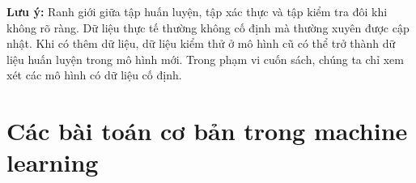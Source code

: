 \textbf{Lưu ý:} Ranh giới giữa tập huấn luyện, tập xác thực và tập kiểm tra
đôi khi không rõ ràng. Dữ liệu thực tế thường không cố định mà thường xuyên được
cập nhật. Khi có thêm dữ liệu, dữ liệu kiểm thử ở mô hình cũ có thể trở thành dữ
liệu huấn luyện trong mô hình mới. Trong phạm vi cuốn sách, chúng ta chỉ xem xét
các mô hình có dữ liệu cố định.




\section{Các bài toán cơ bản trong machine learning}








